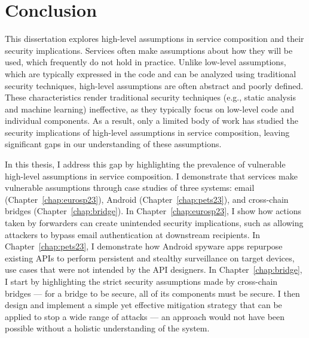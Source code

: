 \chapter{Conclusion}
This dissertation explores high-level assumptions in service composition and their security implications. Services often make assumptions about how they will be used, which frequently do not hold in practice. Unlike low-level assumptions, which are typically expressed in the code and can be analyzed using traditional security techniques, high-level assumptions are often abstract and poorly defined. These characteristics render traditional security techniques (e.g., static analysis and machine learning) ineffective, as they typically focus on low-level code and individual components. As a result, only a limited body of work has studied the security implications of high-level assumptions in service composition, leaving significant gaps in our understanding of these assumptions.


In this thesis, I address this gap by highlighting the prevalence of vulnerable high-level assumptions in service composition. I demonstrate that services make vulnerable assumptions through case studies of three systems: email (Chapter~\ref{chap:eurosp23}), Android (Chapter~\ref{chap:pets23}), and cross-chain bridges (Chapter~\ref{chap:bridge}). In Chapter~\ref{chap:eurosp23}, I show how actions taken by forwarders can create unintended security implications, such as allowing attackers to bypass email authentication at downstream recipients. In Chapter~\ref{chap:pets23}, I demonstrate how Android spyware apps repurpose existing APIs to perform persistent and stealthy surveillance on target devices, use cases that were not intended by the API designers. In Chapter~\ref{chap:bridge}, I start by highlighting the strict security assumptions made by cross-chain bridges --- for a bridge to be secure, all of its components must be secure. I then design and implement a simple yet effective mitigation strategy that can be applied to stop a wide range of attacks --- an approach would not have been possible without a holistic understanding of the system.


